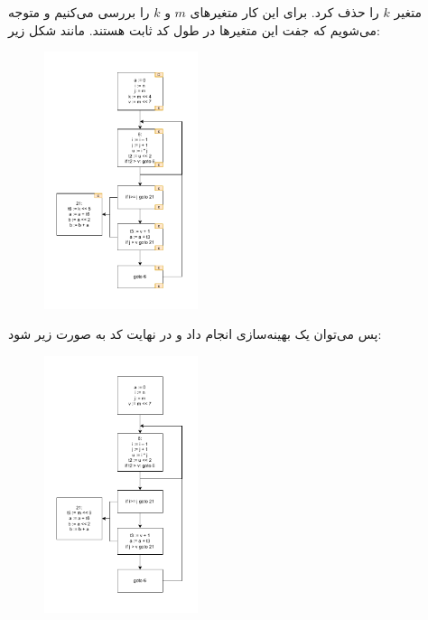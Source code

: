 \documentclass[]{article}
\begin{document}
متغیر
$k$
را حذف کرد. برای این کار
متغیر‌های
$m$ و $k$
را بررسی می‌کنیم و متوجه می‌شویم که جفت این متغیر‌ها در طول کد ثابت هستند. مانند شکل زیر:
\begin{figure}[H]
    \centering
    \includegraphics[width=0.4\textwidth]{figure/Q5-07-k-lifetime.pdf}
\end{figure}
پس می‌توان یک بهینه‌سازی
انجام داد و در نهایت کد به صورت زیر شود:
\begin{figure}[H]
    \centering
    \includegraphics[width=0.4\textwidth]{figure/Q5-Final.pdf}
\end{figure}
\end{document}
